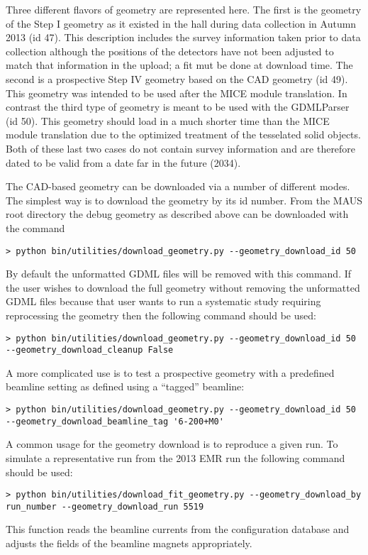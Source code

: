 Three different flavors of geometry are represented here. The first is
the geometry of the Step I geometry as it existed in the hall during
data collection in Autumn 2013 (id 47). This description includes the
survey information taken prior to data collection although the
positions of the detectors have not been adjusted to match that
information in the upload; a fit mut be done at download time. The
second is a prospective Step IV geometry based on the CAD geometry (id
49). This geometry was intended to be used after the MICE module
translation. In contrast the third type of geometry is meant to be
used with the GDMLParser (id 50). This geometry should load in a much
shorter time than the MICE module translation due to the optimized
treatment of the tesselated solid objects. Both of these last two
cases do not contain survey information and are therefore dated to be
valid from a date far in the future (2034).

The CAD-based geometry can be downloaded via a number of different
modes. The simplest way is to download the geometry by its id
number. From the MAUS root directory the debug geometry as described
above can be downloaded with the command
\begin{verbatim}
> python bin/utilities/download_geometry.py --geometry_download_id 50
\end{verbatim}
By default the unformatted GDML files will be removed with this
command. If the user wishes to download the full geometry without
removing the unformatted GDML files because that user wants to run a systematic
study requiring reprocessing the geometry then the following command
should be used:
\begin{verbatim}
> python bin/utilities/download_geometry.py --geometry_download_id 50 --geometry_download_cleanup False
\end{verbatim}
A more complicated use is to test a prospective geometry with a
predefined beamline setting as defined using a ``tagged'' beamline:
\begin{verbatim}
> python bin/utilities/download_geometry.py --geometry_download_id 50 --geometry_download_beamline_tag '6-200+M0'
\end{verbatim}

A common usage for the geometry download is to reproduce a given
run. To simulate a representative run from the 2013 EMR run the
following command should be used:
\begin{verbatim}
> python bin/utilities/download_fit_geometry.py --geometry_download_by run_number --geometry_download_run 5519
\end{verbatim}
This function reads the beamline currents from the configuration
database and adjusts the fields of the beamline magnets appropriately.

